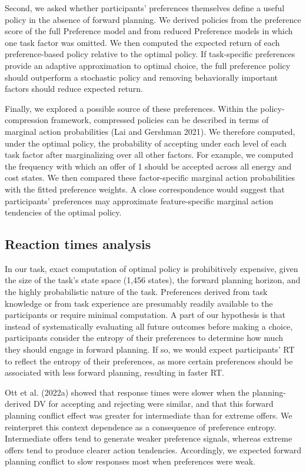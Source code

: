 \documentclass[
  letterpaper,
  DIV=11,
  numbers=noendperiod]{scrartcl}
\begin{document}
Second, we asked whether participants' preferences themselves define a
useful policy in the absence of forward planning. We derived policies
from the preference score of the full Preference model and from reduced
Preference models in which one task factor was omitted. We then computed
the expected return of each preference-based policy relative to the
optimal policy. If task-specific preferences provide an adaptive
approximation to optimal choice, the full preference policy should
outperform a stochastic policy and removing behaviorally important
factors should reduce expected return.

Finally, we explored a possible source of these preferences. Within the
policy-compression framework, compressed policies can be described in
terms of marginal action probabilities (Lai and Gershman 2021). We
therefore computed, under the optimal policy, the probability of
accepting under each level of each task factor after marginalizing over
all other factors. For example, we computed the frequency with which an
offer of 1 should be accepted across all energy and cost states. We then
compared these factor-specific marginal action probabilities with the
fitted preference weights. A close correspondence would suggest that
participants' preferences may approximate feature-specific marginal
action tendencies of the optimal policy.

\subsection{Reaction times analysis}\label{sec-RT-model-method}

In our task, exact computation of optimal policy is prohibitively
expensive, given the size of the task's state space (1,456 states), the
forward planning horizon, and the highly probabilistic nature of the
task. Preferences derived from task knowledge or from task experience
are presumably readily available to the participants or require minimal
computation. A part of our hypothesis is that instead of systematically
evaluating all future outcomes before making a choice, participants
consider the entropy of their preferences to determine how much they
should engage in forward planning. If so, we would expect participants'
RT to reflect the entropy of their preferences, as more certain
preferences should be associated with less forward planning, resulting
in faster RT.

Ott et al. (2022a) showed that response times were slower when the
planning-derived DV for accepting and rejecting were similar, and that
this forward planning conflict effect was greater for intermediate than
for extreme offers. We reinterpret this context dependence as a
consequence of preference entropy. Intermediate offers tend to generate
weaker preference signals, whereas extreme offers tend to produce
clearer action tendencies. Accordingly, we expected forward planning
conflict to slow responses most when preferences were weak.
\end{document}
